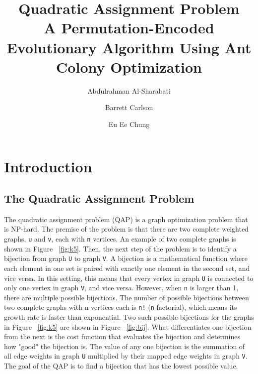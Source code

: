 \documentclass[sigconf]{acmart}
\begin{document}
\title{Quadratic Assignment Problem \\
\large A Permutation-Encoded Evolutionary Algorithm Using Ant Colony Optimization
}

\author{Abdulrahman Al-Sharabati}

\author{Barrett Carlson}

\author{Eu Ee Chung}

\begin{abstract}
\end{abstract}

\maketitle

\section {Introduction}

\subsection {The Quadratic Assignment Problem}
The quadratic assignment problem (QAP) is a graph optimization problem that is NP-hard. The premise of the problem is that there are two complete weighted graphs, \verb|u| and \verb|v|, each with \verb|n| vertices. An example of two complete graphs is shown in Figure ~\ref{fig:k5}. Then, the next step of the problem is to identify a bijection from graph \verb|U| to graph \verb|V|. A bijection is a mathematical function where each element in one set is paired with exactly one element in the second set, and vice versa. In this setting, this means that every vertex in graph \verb|U| is connected to only one vertex in graph \verb|V|, and vice versa. However, when \verb|n| is larger than 1, there are multiple possible bijections. The number of possible bijections between two complete graphs with n vertices each is \verb|n!| (\verb|n| factorial), which means its growth rate is faster than exponential. Two such possible bijections for the graphs in Figure ~\ref{fig:k5} are shown in Figure ~\ref{fig:bij}. What differentiates one bijection from the next is the cost function that evaluates the bijection and determines how "good" the bijection is. The value of any one bijection is the summation of all edge weights in graph \verb|U| multiplied by their mapped edge weights in graph \verb|V|. The goal of the QAP is to find a bijection that has the lowest possible value.
\end{document}
